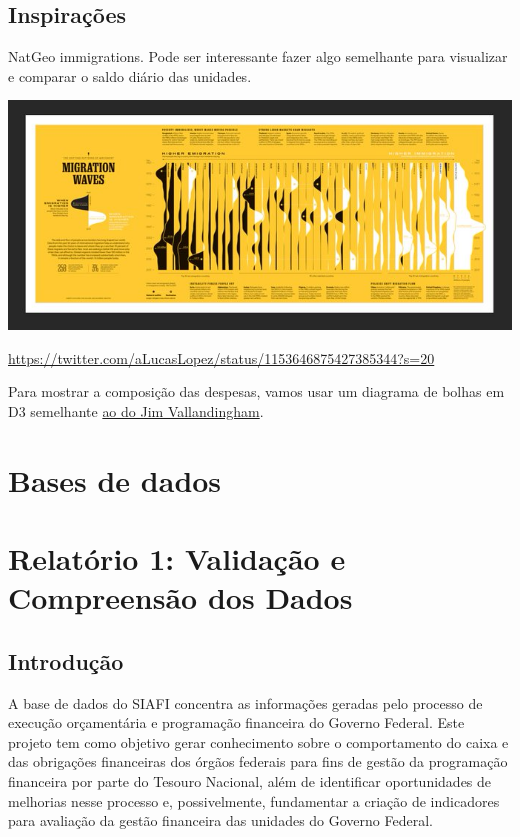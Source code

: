 \documentclass[]{book}
\begin{document}
\hypertarget{inspirauxe7uxf5es}{%
\section{Inspirações}\label{inspirauxe7uxf5es}}

NatGeo immigrations. Pode ser interessante fazer algo semelhante para visualizar e comparar o saldo diário das unidades.

\includegraphics{natgeo.jpg}

\url{https://twitter.com/aLucasLopez/status/1153646875427385344?s=20}

Para mostrar a composição das despesas, vamos usar um diagrama de bolhas em D3 semelhante \href{https://vallandingham.me/bubble_charts_with_d3v4.html}{ao do Jim Vallandingham}.

\hypertarget{bases-de-dados}{%
\chapter{Bases de dados}\label{bases-de-dados}}

\hypertarget{relatuxf3rio-1-validauxe7uxe3o-e-compreensuxe3o-dos-dados}{%
\chapter{Relatório 1: Validação e Compreensão dos Dados}\label{relatuxf3rio-1-validauxe7uxe3o-e-compreensuxe3o-dos-dados}}

\hypertarget{introduuxe7uxe3o-1}{%
\section{Introdução}\label{introduuxe7uxe3o-1}}

A base de dados do SIAFI concentra as informações geradas pelo processo de execução orçamentária e programação financeira do Governo Federal. Este projeto tem como objetivo gerar conhecimento sobre o comportamento do caixa e das obrigações financeiras dos órgãos federais para fins de gestão da programação financeira por parte do Tesouro Nacional, além de identificar oportunidades de melhorias nesse processo e, possivelmente, fundamentar a criação de indicadores para avaliação da gestão financeira das unidades do Governo Federal.
\end{document}

